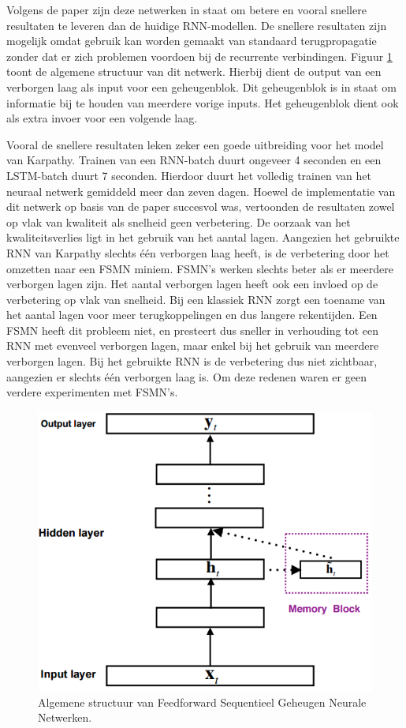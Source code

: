 Volgens de paper zijn deze netwerken in staat om betere en vooral snellere resultaten te leveren dan de huidige RNN-modellen. De snellere resultaten zijn mogelijk omdat gebruik kan worden gemaakt van standaard terugpropagatie zonder dat er zich problemen voordoen bij de recurrente verbindingen. Figuur \ref{fig:fsmn} toont de  algemene structuur van dit netwerk. Hierbij dient de output van een verborgen laag als input voor een geheugenblok. Dit geheugenblok is in staat om informatie bij te houden van meerdere vorige inputs. Het geheugenblok dient ook als extra invoer voor een volgende laag.

Vooral de snellere resultaten leken zeker een goede uitbreiding voor het model van Karpathy. Trainen van een RNN-batch duurt ongeveer 4 seconden en een LSTM-batch duurt 7 seconden. Hierdoor duurt het volledig trainen van het neuraal netwerk gemiddeld meer dan zeven dagen.
Hoewel de implementatie van dit netwerk op basis van de paper succesvol was, vertoonden de resultaten zowel op vlak van kwaliteit als snelheid geen verbetering. De oorzaak van het kwaliteitsverlies ligt in het gebruik van het aantal lagen. Aangezien het gebruikte RNN van Karpathy slechts \'e\'en verborgen laag heeft, is de verbetering door het omzetten naar een FSMN miniem. FSMN's werken slechts beter als er meerdere verborgen lagen zijn. Het aantal verborgen lagen heeft ook een invloed op de verbetering op vlak van snelheid. Bij een klassiek RNN zorgt een toename van het aantal lagen voor meer terugkoppelingen en dus langere rekentijden. Een FSMN heeft dit probleem niet, en presteert dus sneller in verhouding tot een RNN met evenveel verborgen lagen, maar enkel bij het gebruik van meerdere verborgen lagen. Bij het gebruikte RNN is de verbetering dus niet zichtbaar, aangezien er slechts \'e\'en verborgen laag is. Om deze redenen waren er geen verdere experimenten met FSMN's.

\begin{figure}[tb]
	\centering
	\includegraphics[width=0.6\linewidth]{Images/FSMN}
	\caption{Algemene structuur van Feedforward Sequentieel Geheugen Neurale Netwerken.}
	\label{fig:fsmn}
\end{figure}

